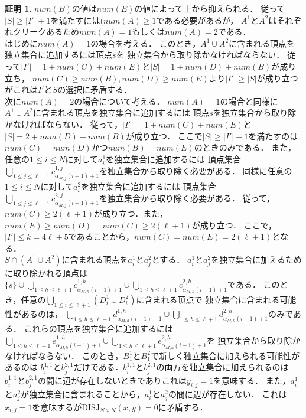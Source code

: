 \documentclass[12pt]{thesis}
\theoremstyle{definition}
\newtheorem*{prf*}{証明}
\begin{document}
\begin{prf*}
$num(B)$の値は$num(E)$の値によって上から抑えられる．
従って$|S|\geq |I'|+1$を満たすには$(num(A) \geq 1$である必要があるが，
$A^{1}$と$A^{2}$はそれぞれクリークあるため$num(A) = 1$もしくは$num(A) = 2$である．\\
はじめに$num(A)=1$の場合を考える．
このとき，$A^{1} \cup A^{2}$に含まれる頂点を独立集合に追加するには頂点$s$を
独立集合から取り除かなければならない．
従って$|I'|=1+num(C)+num(E)$と$|S|=1+num(D)+num(B)$が成り立ち，
$num(C)\geq num(B), num(D)\geq num(E)$より$|I'|\geq |S|$が成り立つがこれは$I'$と$S$の選択に矛盾する．\\
次に$num(A)=2$の場合について考える．
$num(A)=1$の場合と同様に$A^{1} \cup A^{2}$に含まれる頂点を独立集合に追加するには
頂点$s$を独立集合から取り除かなければならない．
従って，$|I'|=1+num(C)+num(E)$と$|S|=2+num(D)+num(B)$が成り立つ．
ここで$|S| \geq |I'|+1$を満たすのは$num(C)=num(D)$かつ$num(B)=num(E)$のときのみである．
また，任意の$1\leq i \leq N$に対して$a^{1}_{i}$を独立集合に追加するには
頂点集合$\bigcup_{1\leq j \leq \ell+1} c^{1,j}_{\alpha_{M,j}(i-1)+1}$を独立集合から取り除く必要がある．
同様に任意の$1\leq i \leq N$に対して$a^{2}_{i}$を独立集合に追加するには
頂点集合$\bigcup_{1\leq j \leq \ell+1} c^{2,j}_{\alpha_{M,j}(i-1)+1}$を独立集合から取り除く必要がある．
従って，$num(C) \geq 2 (\ell+1)$が成り立つ．また，$num(E)\geq num(D)=num(C) \geq 2(\ell+1)$が成り立つ．
ここで，$|I'|\leq k=4\ell+5$であることから，$num(C)=num(E)=2(\ell+1)$となる． \\
$S \cap (A^{1}\cup A^{2})$に含まれる頂点を$a^{1}_{i}$と$a^{2}_{j}$とする．
$a^{1}_{i}$と$a^{2}_{j}$を独立集合に加えるために取り除かれる頂点は
$\{s\} \cup \bigcup_{1\leq h \leq \ell+1} c^{1,h}_{\alpha_{M,h}(i-1)+1} \cup 
\bigcup_{1\leq h \leq \ell+1} c^{2,h}_{\alpha_{M,h}(i-1)+1}$である．
このとき，任意の$\bigcup_{1 \leq i \leq \ell+1}(D^{1}_{i}\cup D^{2}_{i})$に含まれる頂点で
独立集合に含まれる可能性があるのは，
$\bigcup_{1\leq h \leq \ell+1} d^{1,h}_{\alpha_{M,h}(i-1)+1}\cup 
\bigcup_{1\leq h \leq \ell+1} d^{2,h}_{\alpha_{M,h}(i-1)+1}$のみである．
これらの頂点を独立集合に追加するには
$\bigcup_{1\leq h \leq \ell+1} e^{1,h}_{\alpha_{M,h}(i-1)+1}\cup 
\bigcup_{1\leq h \leq \ell+1} e^{2,h}_{\alpha_{M,h}(i-1)+1}$を
独立集合から取り除かなければならない．
このとき，$B^{1}_{1}$と$B^{2}_{1}$で新しく独立集合に加えられる可能性があるのは
$b^{1,1}_{i}$と$b^{2,1}_{j}$だけである．$b^{1,1}_{i}$と$b^{2,1}_{j}$の両方を独立集合に加えられるのは
$b^{1,1}_{i}$と$b^{2,1}_{j}$の間に辺が存在しないときでありこれは$y_{i,j}=1$を意味する．
また，$a^{1}_{i}$と$a^{2}_{j}$が独立集合に含まれることから，$a^{1}_{i}$と$a^{2}_{j}$の間に辺が存在しない．
これは$x_{i,j}=1$を意味するが$\mathrm{DISJ}_{N\times N}(x,y)=0$に矛盾する．


\end{prf*}
\end{document}
